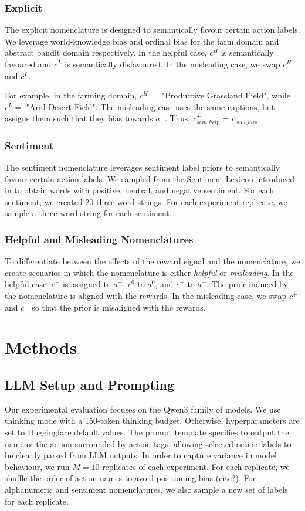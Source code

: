 \documentclass{article} %
\begin{document}
\subsubsection*{Explicit}
The explicit nomenclature is designed to semantically favour certain action labels. We leverage world-knowledge bias and ordinal bias for the farm domain and abstract bandit domain respectively. In the helpful case, $c^H$ is semantically favoured and $c^L$ is semantically disfavoured. In the misleading case, we swap $c^H$ and $c^L$. 

For example, in the farming domain, $c^H = $ "Productive Grassland Field", while $c^L = $ "Arid Desert Field". The misleading case uses the same captions, but assigns them such that they bias towards $a^-$. Thus, $c^+_{sem\_help}$ = $c^-_{sem\_mis}$.

\subsubsection*{Sentiment}
The sentiment nomenclature leverages sentiment label priors to semantically favour certain action labels. We sampled from the Sentiment Lexicon introduced in \citet{mohammad2013crowdsourcing} to obtain words with positive, neutral, and negative sentiment. For each sentiment, we created 20 three-word strings. For each experiment replicate, we sample a three-word string for each sentiment. 

\subsubsection*{Helpful and Misleading Nomenclatures}
To differentiate between the effects of the reward signal and the nomenclature, we create scenarios in which the nomenclature is either \textit{helpful} or \textit{misleading}. In the helpful case, $c^+$ is assigned to $a^+$, $c^0$ to $a^0$, and $c^-$ to $a^-$. The prior induced by the nomenclature is aligned with the rewards. In the misleading case, we swap $c^+$ and $c^-$ so that the prior is misaligned with the rewards.

\section{Methods}

\subsection*{LLM Setup and Prompting}
Our experimental evaluation focuses on the Qwen3 family of models. We use thinking mode with a 150-token thinking budget. Otherwise, hyperparameters are set to Huggingface default values. The prompt template specifies to output the name of the action surrounded by action tags, allowing selected action labels to be cleanly parsed from LLM outputs. In order to capture variance in model behaviour, we run $M=10$ replicates of each experiment. For each replicate, we shuffle the order of action names to avoid positioning bias (cite?). For alphanumeric and sentiment nomenclatures, we also sample a new set of labels for each replicate.
\end{document}
